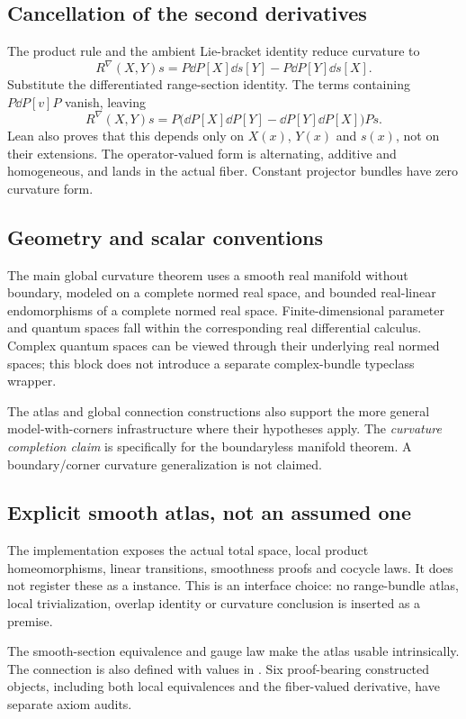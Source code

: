 \subsection{Cancellation of the second derivatives}
The product rule and the ambient Lie-bracket identity reduce curvature to
\[
R^\nabla(X,Y)s=P\dd P[X]\dd s[Y]-P\dd P[Y]\dd s[X].
\]
Substitute the differentiated range-section identity. The terms containing $P\dd P[v]P$ vanish, leaving
\[
R^\nabla(X,Y)s=
P\bigl(\dd P[X]\dd P[Y]-\dd P[Y]\dd P[X]\bigr)P s.
\]
Lean also proves that this depends only on $X(x)$, $Y(x)$ and $s(x)$, not on their extensions. The operator-valued form is alternating, additive and homogeneous, and lands in the actual fiber. Constant projector bundles have zero curvature form.





\subsection{Geometry and scalar conventions}
The main global curvature theorem uses a smooth real manifold without boundary, modeled on a complete normed real space, and bounded real-linear endomorphisms of a complete normed real space. Finite-dimensional parameter and quantum spaces fall within the corresponding real differential calculus. Complex quantum spaces can be viewed through their underlying real normed spaces; this block does not introduce a separate complex-bundle typeclass wrapper.

The atlas and global connection constructions also support the more general model-with-corners infrastructure where their hypotheses apply. The \emph{curvature completion claim} is specifically for the boundaryless manifold theorem. A boundary/corner curvature generalization is not claimed.

\subsection{Explicit smooth atlas, not an assumed one}
The implementation exposes the actual total space, local product homeomorphisms, linear transitions, smoothness proofs and cocycle laws. It does not register these as a  instance. This is an interface choice: no range-bundle atlas, local trivialization, overlap identity or curvature conclusion is inserted as a premise.

The smooth-section equivalence and gauge law make the atlas usable intrinsically. The connection is also defined with values in . Six proof-bearing constructed objects, including both local equivalences and the fiber-valued derivative, have separate axiom audits.

